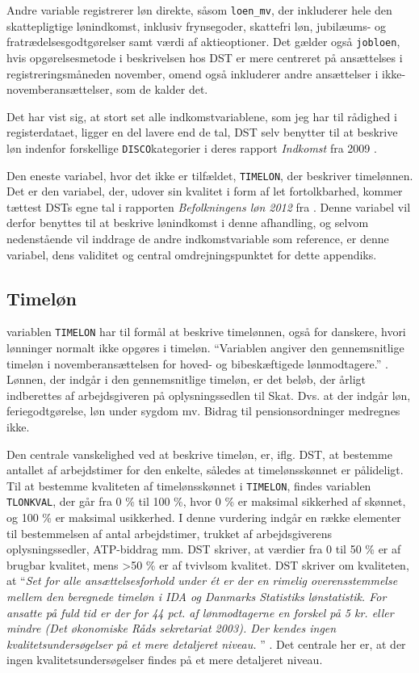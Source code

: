Andre variable registrerer løn direkte, såsom \texttt{loen\_mv}, der inkluderer hele den skattepligtige lønindkomst, inklusiv frynsegoder, skattefri løn, jubilæums- og fratrædelsesgodtgørelser samt værdi af aktieoptioner. Det gælder også \texttt{jobloen}, hvis opgørelsesmetode i beskrivelsen hos DST er mere centreret på ansættelses i registreringsmåneden november, omend også inkluderer andre ansættelser i ikke-novemberansættelser, som de kalder det. \label{indkomstvariable}

Det har vist sig, at stort set alle indkomstvariablene, som jeg har til rådighed i registerdataet, ligger en del lavere end de tal, DST selv benytter til at beskrive løn indenfor forskellige \texttt{DISCO}kategorier i deres rapport \emph{Indkomst} fra 2009  \textcite{DST2009}.  

Den eneste variabel, hvor det ikke er tilfældet, \texttt{TIMELON}, der beskriver timelønnen. Det er den variabel, der, udover sin kvalitet i form af let fortolkbarhed, kommer tættest DSTs egne tal i rapporten \emph{Befolkningens løn 2012}  fra \citeyear{DST2012b}. Denne variabel vil derfor benyttes til at beskrive lønindkomst i denne afhandling, og selvom nedenstående vil inddrage de andre indkomstvariable som reference, er denne variabel, dens validitet og central omdrejningspunktet for dette appendiks. 

\subsection{Timeløn \label{}}

variablen \texttt{TIMELON} har til formål at beskrive timelønnen, også for danskere, hvori lønninger normalt ikke opgøres i timeløn. “Variablen angiver den gennemsnitlige timeløn i novemberansættelsen for hoved- og bibeskæftigede lønmodtagere.” \parencite{DST-TIMELON}. Lønnen, der indgår i den gennemsnitlige timeløn, er det beløb, der årligt indberettes af arbejdsgiveren på oplysningssedlen til Skat. Dvs. at der indgår løn, feriegodtgørelse, løn under sygdom mv. Bidrag til pensionsordninger medregnes ikke. 

Den centrale vanskelighed ved at beskrive timeløn, er, iflg. DST, at bestemme antallet af arbejdstimer for den enkelte, således at timelønsskønnet er pålideligt. Til at bestemme kvaliteten af timelønsskønnet i \texttt{TIMELON}, findes variablen \texttt{TLONKVAL}, der går fra 0 \% til 100 \%, hvor 0 \% er maksimal sikkerhed af skønnet, og 100 \% er maksimal usikkerhed. I denne vurdering indgår en række elementer til bestemmelsen af antal arbejdstimer, trukket af arbejdsgiverens oplysningssedler, ATP-biddrag mm. DST skriver, at værdier fra 0 til 50 \% er af brugbar kvalitet, mens >50 \% er af tvivlsom kvalitet. DST skriver om kvaliteten, at “\emph{Set for alle ansættelsesforhold under ét er der en rimelig overensstemmelse mellem den beregnede timeløn i IDA og Danmarks Statistiks lønstatistik. For ansatte på fuld tid er der for 44 pct. af lønmodtagerne en forskel på 5 kr. eller mindre (Det økonomiske Råds sekretariat 2003). Der kendes ingen kvalitetsundersøgelser på et mere detaljeret niveau. }” \parencite{DST-TIMELON}. Det centrale her er, at der ingen kvalitetsundersøgelser findes på et mere detaljeret niveau. 

